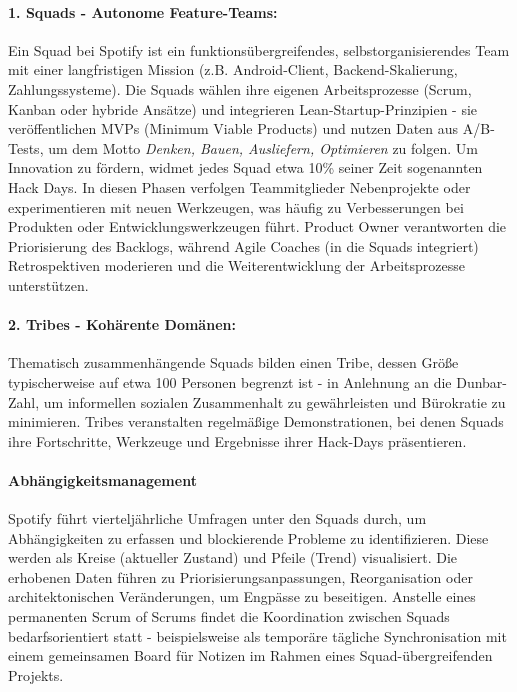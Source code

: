 \paragraph{1. Squads - Autonome Feature-Teams:}Ein Squad bei Spotify ist ein funktionsübergreifendes,
selbstorganisierendes Team mit einer langfristigen Mission (z.B. Android-Client, Backend-Skalierung, Zahlungssysteme).
Die Squads wählen ihre eigenen Arbeitsprozesse (Scrum, Kanban oder hybride Ansätze) und integrieren Lean-Startup-Prinzipien -
sie veröffentlichen MVPs (Minimum Viable Products) und nutzen Daten aus A/B-Tests,
um dem Motto \textit{Denken, Bauen, Ausliefern, Optimieren} zu folgen.
Um Innovation zu fördern, widmet jedes Squad etwa 10\% seiner Zeit sogenannten Hack Days.
In diesen Phasen verfolgen Teammitglieder Nebenprojekte oder experimentieren mit neuen Werkzeugen,
was häufig zu Verbesserungen bei Produkten oder Entwicklungswerkzeugen führt. Product Owner verantworten die Priorisierung des Backlogs,
während Agile Coaches (in die Squads integriert) Retrospektiven moderieren und die Weiterentwicklung der Arbeitsprozesse unterstützen.

\paragraph{2. Tribes - Kohärente Domänen:}
Thematisch zusammenhängende Squads bilden einen Tribe, dessen Größe typischerweise auf etwa 100 Personen begrenzt ist -
in Anlehnung an die Dunbar-Zahl, um informellen sozialen Zusammenhalt zu gewährleisten und Bürokratie zu minimieren.
Tribes veranstalten regelmäßige Demonstrationen, bei denen Squads ihre Fortschritte, Werkzeuge und Ergebnisse ihrer Hack-Days präsentieren.

\paragraph{Abhängigkeitsmanagement}
Spotify führt vierteljährliche Umfragen unter den Squads durch, um Abhängigkeiten zu erfassen und blockierende Probleme zu identifizieren. 
Diese werden als Kreise (aktueller Zustand) und Pfeile (Trend) visualisiert. Die erhobenen Daten führen zu Priorisierungsanpassungen,
Reorganisation oder architektonischen Veränderungen, um Engpässe zu beseitigen. Anstelle eines permanenten Scrum of Scrums findet
die Koordination zwischen Squads bedarfsorientiert statt - beispielsweise als temporäre tägliche Synchronisation mit einem gemeinsamen Board
für Notizen im Rahmen eines Squad-übergreifenden Projekts.

